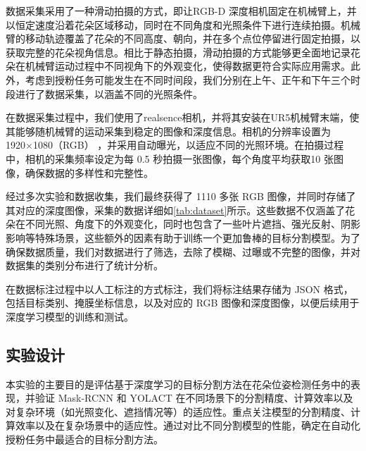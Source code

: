 数据采集采用了一种滑动拍摄的方式，即让RGB-D 深度相机固定在机械臂上，并以恒定速度沿着花朵区域移动，同时在不同角度和光照条件下进行连续拍摄。机械臂的移动轨迹覆盖了花朵的不同高度、朝向，并在多个点位停留进行固定拍摄，以获取完整的花朵视角信息。相比于静态拍摄，滑动拍摄的方式能够更全面地记录花朵在机械臂运动过程中不同视角下的外观变化，使得数据更符合实际应用需求。此外，考虑到授粉任务可能发生在不同时间段，我们分别在上午、正午和下午三个时段进行了数据采集，以涵盖不同的光照条件。



在数据采集过程中，我们使用了realsence相机，并将其安装在UR5机械臂末端，使其能够随机械臂的运动采集到稳定的图像和深度信息。相机的分辨率设置为 1920×1080（RGB） ，并采用自动曝光，以适应不同的光照环境。在拍摄过程中，相机的采集频率设定为每 0.5 秒拍摄一张图像，每个角度平均获取10 张图像，确保数据的多样性和完整性。
\begin{table}[htbp]
	\caption[不同光照条件数据采集]{不同光照条件数据采集}
	\label{tab:dataset}
\end{table}

经过多次实验和数据收集，我们最终获得了 1110 多张 RGB 图像，并同时存储了其对应的深度图像，采集的数据详细如\cref{tab:dataset}所示。这些数据不仅涵盖了花朵在不同光照、角度下的外观变化，同时也包含了一些叶片遮挡、强光反射、阴影影响等特殊场景，这些额外的因素有助于训练一个更加鲁棒的目标分割模型。为了确保数据质量，我们对数据进行了筛选，去除了模糊、过曝或不完整的图像，并对数据集的类别分布进行了统计分析。

在数据标注过程中以人工标注的方式标注，我们将标注结果存储为 JSON 格式，包括目标类别、掩膜坐标信息，以及对应的 RGB 图像和深度图像，以便后续用于深度学习模型的训练和测试。

\subsection{实验设计} 
本实验的主要目的是评估基于深度学习的目标分割方法在花朵位姿检测任务中的表现，并验证 Mask-RCNN 和 YOLACT 在不同场景下的分割精度、计算效率以及对复杂环境（如光照变化、遮挡情况等）的适应性。重点关注模型的分割精度、计算效率以及在复杂场景中的适应性。通过对比不同分割模型的性能，确定在自动化授粉任务中最适合的目标分割方法。

